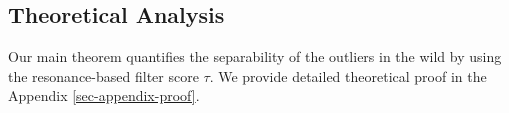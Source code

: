 



\subsection{Theoretical Analysis}
\label{subsec-Theoretical}


Our main theorem quantifies the separability of the outliers in the wild by using the resonance-based filter score $\tau$. We provide detailed theoretical proof in the Appendix \ref{sec-appendix-proof}.

